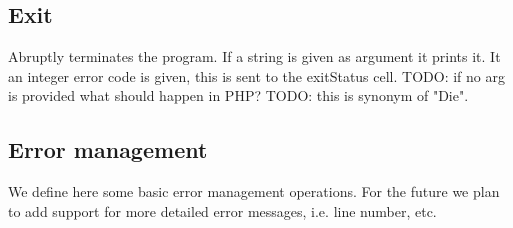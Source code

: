 \documentclass{article}
\begin{document}
\begin{kdefinition}
\begin{module}{}
\begin{kblock}[text]
 \subsection{Exit} 
		Abruptly terminates the program. If a string is given as argument it prints it. 
		It an integer error code is given, this is sent to the exitStatus cell. 
		TODO: if no arg is provided what should happen in PHP? 
		TODO: this is synonym of "Die". \end{kblock}
\end{module}
\begin{module}{}
\begin{kblock}[text]
 \section{Error management} 
		We define here some basic error management operations.
		For the future we plan to add support for more detailed error messages, i.e. 
		line number, etc. \end{kblock}

\begin{syntaxBlock}{}
\end{syntaxBlock}

\begin{syntaxBlock}{}
\end{syntaxBlock}

\begin{syntaxBlock}{}
\end{syntaxBlock}


\end{module}
\end{kdefinition}
\end{document}

